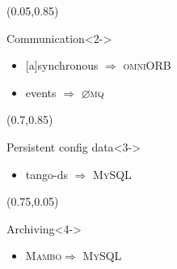 \documentclass{beamer}
\newcommand{\onmiORB}{\textsc{omniORB}}
\newcommand{\zmq}{\textsc{$\varnothing$mq}}
\newcommand{\mysql}{\textsc{MySQL}}
\newcommand{\mambo}{\textsc{Mambo}}
\begin{document}
\begin{frame}
    \begin{figure}[h]
    \end{figure}
    \begin{textblock*}{60mm}(0.05\textwidth,0.85\textheight)
        \begin{exampleblock}{Communication}<2->
            \begin{itemize}
                \item {[a]}synchronous $\Rightarrow$ \onmiORB
                \item events $\Rightarrow$ \zmq
            \end{itemize}
        \end{exampleblock}
    \end{textblock*}
    \begin{textblock*}{45mm}(0.7\textwidth,0.85\textheight)
        \begin{exampleblock}{Persistent config data}<3->
            \begin{itemize}
                \item tango-ds $\Rightarrow$ \mysql
            \end{itemize}
        \end{exampleblock}
    \end{textblock*}
    \begin{textblock*}{45mm}(0.75\textwidth,0.05\textheight)
        \begin{exampleblock}{Archiving}<4->
            \begin{itemize}
                \item \mambo $\Rightarrow$ \mysql

\end{itemize}
\end{exampleblock}
\end{textblock*}
\end{frame}
\end{document}
